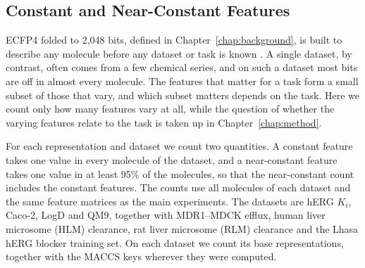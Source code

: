 

\subsection{Constant and Near-Constant Features}\label{sec:flaws:constant} %
ECFP4 folded to 2,048 bits, defined in Chapter~\ref{chap:background}, is built to describe any molecule before any dataset or task is known \citep{rogers2010}. A single dataset, by contrast, often comes from a few chemical series, and on such a dataset most bits are off in almost every molecule. The features that matter for a task form a small subset of those that vary, and which subset matters depends on the task. Here we count only how many features vary at all, while the question of whether the varying features relate to the task is taken up in Chapter~\ref{chap:method}.

For each representation and dataset we count two quantities. A constant feature takes one value in every molecule of the dataset, and a near-constant feature takes one value in at least 95\% of the molecules, so that the near-constant count includes the constant features. The counts use all molecules of each dataset and the same feature matrices as the main experiments. The datasets are hERG $K_i$, Caco-2, LogD and QM9, together with MDR1--MDCK efflux, human liver microsome (HLM) clearance, rat liver microsome (RLM) clearance and the Lhasa hERG blocker training set. On each dataset we count its base representations, together with the MACCS keys wherever they were computed.

